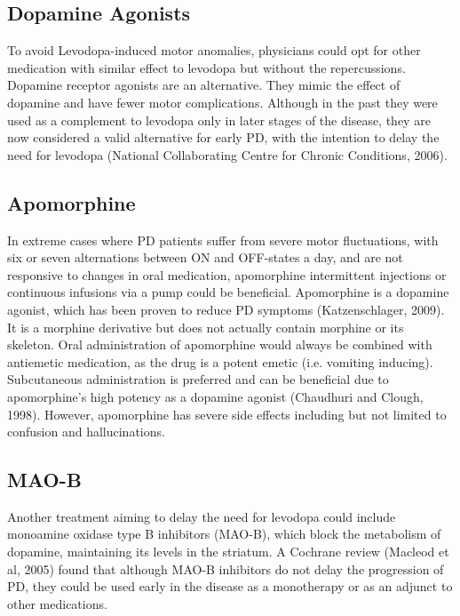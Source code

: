 \subsection{Dopamine Agonists}
\label{subsec:dopamineAgonists}
To avoid Levodopa-induced motor anomalies, physicians could opt for other medication with similar effect to levodopa but without the repercussions. Dopamine receptor agonists are an alternative. They mimic the effect of dopamine and have fewer motor complications. Although in the past they were used as a complement to levodopa only in later stages of the disease, they are now considered a valid alternative for early PD, with the intention to delay the need for levodopa (National Collaborating Centre for Chronic Conditions, 2006). 


\subsection{Apomorphine}
\label{subsec:apomorphine}
In extreme cases where PD patients suffer from severe motor fluctuations, with six or seven alternations between ON and OFF-states a day, and are not responsive to changes in oral medication, apomorphine intermittent injections or continuous infusions via a pump could be beneficial. Apomorphine is a dopamine agonist, which has been proven to reduce PD symptoms (Katzenschlager, 2009). It is a morphine derivative but does not actually contain morphine or its skeleton. Oral administration of apomorphine would always be combined with antiemetic medication, as the drug is a potent emetic (i.e. vomiting inducing). Subcutaneous administration is preferred and can be beneficial due to apomorphine's high potency as a dopamine agonist (Chaudhuri and Clough, 1998). However, apomorphine has severe side effects including but not limited to confusion and hallucinations. 


\subsection{MAO-B}
\label{subsec:maob}
Another treatment aiming to delay the need for levodopa could include monoamine oxidase type B inhibitors (MAO-B), which block the metabolism of dopamine, maintaining its levels in the striatum. A Cochrane review (Macleod et al, 2005) found that although MAO-B inhibitors do not delay the progression of PD, they could be used early in the disease as a monotherapy or as an adjunct to other medications. 

